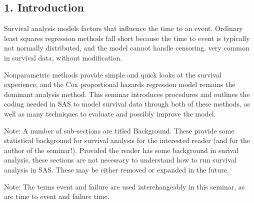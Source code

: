 \documentclass[]{article}
\title{}
\author{}
\begin{document}
	
	\subsection*{1. Introduction}

Survival analysis models factors that influence the time to an event. Ordinary least squares regression methods fall short because the time to event is typically not normally distributed, and the model cannot handle censoring, very common in survival data, without modification. 

Nonparametric methods provide simple and quick looks at the survival experience, and the Cox proportional hazards regression model remains the dominant analysis method. This seminar introduces procedures and outlines the coding needed in SAS to model survival data through both of these methods, as well as many techniques to evaluate and possibly improve the model. 


Note: A number of sub-sections are titled Background. These provide some statistical background for survival analysis for the interested reader (and for the author of the seminar!). Provided the reader has some background in surival analysis, these sections are not necessary to understand how to run survival analysis in SAS. These may be either removed or expanded in the future.

Note: The terms event and failure are used interchangeably in this seminar, as are time to event and failure time.
\end{document}
